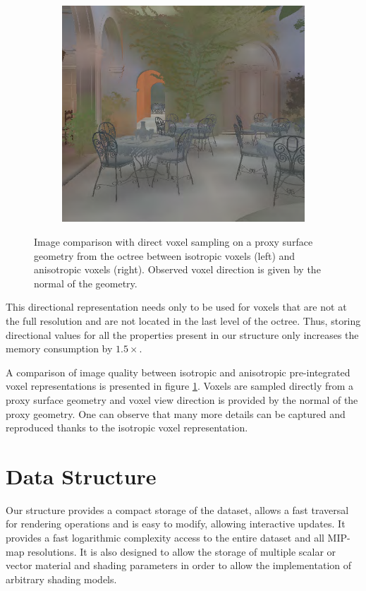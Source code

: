 \begin{figure}
\begin{subfigure}[b]{0.5\textwidth}
		\includegraphics[width=1.0\textwidth]{graphics/vct/vct-12-2}
	\end{subfigure}
	\caption{Image comparison with direct voxel sampling on a proxy surface geometry from the octree between isotropic voxels (left) and anisotropic voxels (right). Observed voxel direction is given by the normal of the geometry.}
	\label{f:vct-anisotropic-voxels-2}
\end{figure}

This directional representation needs only to be used for voxels that are not at the full resolution and are not located in the last level of the octree. Thus, storing directional values for all the properties present in our structure only increases the memory consumption by $1.5\times$.

A comparison of image quality between isotropic and anisotropic pre-integrated voxel representations is presented in figure \ref{f:vct-anisotropic-voxels-2}. Voxels are sampled directly from a proxy surface geometry and voxel view direction is provided by the normal of the proxy geometry. One can observe that many more details can be captured and reproduced thanks to the isotropic voxel representation.





\section{Data Structure}
Our structure provides a compact storage of the dataset, allows a fast traversal for rendering operations and is easy to modify, allowing interactive updates. It provides a fast logarithmic complexity access to the entire dataset and all MIP-map resolutions. It is also designed to allow the storage of multiple scalar or vector material and shading parameters in order to allow the implementation of arbitrary shading models. 



